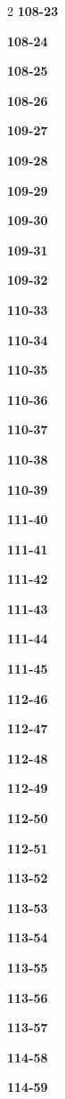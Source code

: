\documentclass[10pt,a4paper]{article}
\begin{document}
\begin{multicols}{2}
\noindent\textbf{108-23}\ \par
\noindent\textbf{108-24}\ \par
\noindent\textbf{108-25}\ \par
\noindent\textbf{108-26}\ \par
\noindent\textbf{109-27}\ \par
\noindent\textbf{109-28}\ \par
\noindent\textbf{109-29}\ \par
\noindent\textbf{109-30}\ \par
\noindent\textbf{109-31}\ \par
\noindent\textbf{109-32}\ \par
\noindent\textbf{110-33}\ \par
\noindent\textbf{110-34}\ \par
\noindent\textbf{110-35}\ \par
\noindent\textbf{110-36}\ \par
\noindent\textbf{110-37}\ \par
\noindent\textbf{110-38}\ \par
\noindent\textbf{110-39}\ \par
\noindent\textbf{111-40}\ \par
\noindent\textbf{111-41}\ \par
\noindent\textbf{111-42}\ \par
\noindent\textbf{111-43}\ \par
\noindent\textbf{111-44}\ \par
\noindent\textbf{111-45}\ \par
\noindent\textbf{112-46}\ \par
\noindent\textbf{112-47}\ \par
\noindent\textbf{112-48}\ \par
\noindent\textbf{112-49}\ \par
\noindent\textbf{112-50}\ \par
\noindent\textbf{112-51}\ \par
\noindent\textbf{113-52}\ \par
\noindent\textbf{113-53}\ \par
\noindent\textbf{113-54}\ \par
\noindent\textbf{113-55}\ \par
\noindent\textbf{113-56}\ \par
\noindent\textbf{113-57}\ \par
\noindent\textbf{114-58}\ \par
\noindent\textbf{114-59}\ \par

\end{multicols}
\end{document}
